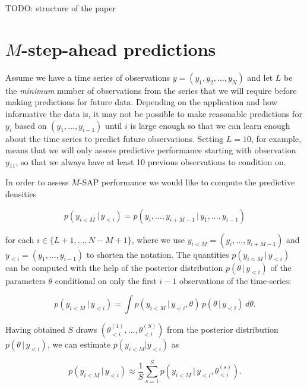 \documentclass[american,]{article}
\begin{document}
TODO: structure of the paper

\hypertarget{m-step-ahead-predictions}{%
\section{\texorpdfstring{\(M\)-step-ahead
predictions}{M-step-ahead predictions}}\label{m-step-ahead-predictions}}

Assume we have a time series of observations
\(y = (y_1, y_2, \ldots, y_N)\) and let \(L\) be the \emph{minimum}
number of observations from the series that we will require before
making predictions for future data. Depending on the application and how
informative the data is, it may not be possible to make reasonable
predictions for \(y_{i}\) based on \((y_1, \dots, y_{i-1})\) until \(i\)
is large enough so that we can learn enough about the time series to
predict future observations. Setting \(L=10\), for example, means that
we will only assess predictive performance starting with observation
\(y_{11}\), so that we always have at least 10 previous observations to
condition on.

In order to assess \(M\)-SAP performance we would like to compute the
predictive densities

\begin{equation}
p(y_{i<M} \,|\, y_{<i}) = p(y_i, \ldots, y_{i + M - 1} \,|\, y_{1},...,y_{i-1}) 
\end{equation}

for each \(i \in \{L + 1, \ldots, N - M + 1\}\), where we use
\(y_{i<M} = (y_i, \ldots, y_{i + M - 1})\) and
\(y_{<i} = (y_{1}, \ldots, y_{i-1})\) to shorten the notation. The
quantities \(p(y_{i<M} \,|\, y_{<i})\) can be computed with the help of
the posterior distribution \(p(\theta \,|\, y_{<i})\) of the parameters
\(\theta\) conditional on only the first \(i-1\) observations of the
time-series:

\begin{equation}
p(y_{i<M} \,| \, y_{<i}) = 
  \int p(y_{i<M} \,| \, y_{<i}, \theta) \, p(\theta\,|\,y_{<i}) \,d\theta. 
\end{equation}

Having obtained \(S\) draws
\((\theta_{<i}^{(1)}, \ldots, \theta_{<i}^{(S)})\) from the posterior
distribution \(p(\theta\,|\,y_{<i})\), we can estimate
\(p(y_{i<M} | y_{<i})\) as

\begin{equation}
p(y_{i<M} \,|\, y_{<i}) \approx \frac{1}{S}
\sum_{s=1}^S p(y_{i<M} \,|\, y_{<i}, \theta_{<i}^{(s)}).
\end{equation}
\end{document}
